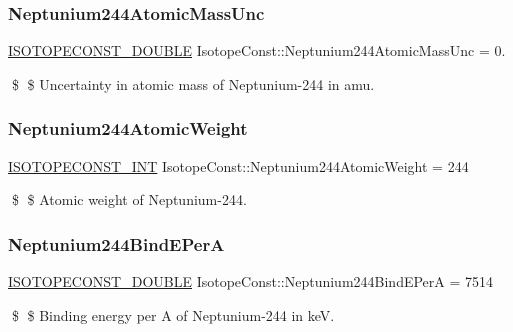 \subsubsection{\texorpdfstring{Neptunium244\+Atomic\+Mass\+Unc}{Neptunium244AtomicMassUnc}}
{\footnotesize\ttfamily \mbox{\hyperlink{group___isotope_const-_macros_ga8f45a7272ce02c0b4c65c44636ed719a}{I\+S\+O\+T\+O\+P\+E\+C\+O\+N\+S\+T\+\_\+\+D\+O\+U\+B\+LE}} Isotope\+Const\+::\+Neptunium244\+Atomic\+Mass\+Unc = 0.}

\$ \$ Uncertainty in atomic mass of Neptunium-\/244 in amu. \mbox{\label{group___isotope_const-_neptunium-_np244_ga9bf68157326c5bf4b1248ad65ede12f3}} 
\subsubsection{\texorpdfstring{Neptunium244\+Atomic\+Weight}{Neptunium244AtomicWeight}}
{\footnotesize\ttfamily \mbox{\hyperlink{group___isotope_const-_macros_ga5f18360b3e99483a35c32d789e62621c}{I\+S\+O\+T\+O\+P\+E\+C\+O\+N\+S\+T\+\_\+\+I\+NT}} Isotope\+Const\+::\+Neptunium244\+Atomic\+Weight = 244}

\$ \$ Atomic weight of Neptunium-\/244. \mbox{\label{group___isotope_const-_neptunium-_np244_ga23b00bd0808583aceea1edcf14c34fad}} 
\subsubsection{\texorpdfstring{Neptunium244\+Bind\+E\+PerA}{Neptunium244BindEPerA}}
{\footnotesize\ttfamily \mbox{\hyperlink{group___isotope_const-_macros_ga8f45a7272ce02c0b4c65c44636ed719a}{I\+S\+O\+T\+O\+P\+E\+C\+O\+N\+S\+T\+\_\+\+D\+O\+U\+B\+LE}} Isotope\+Const\+::\+Neptunium244\+Bind\+E\+PerA = 7514}

\$ \$ Binding energy per A of Neptunium-\/244 in keV. \mbox{\label{group___isotope_const-_neptunium-_np244_gac1c97a6aee53deb78e51cbc1e67580a6}} 
